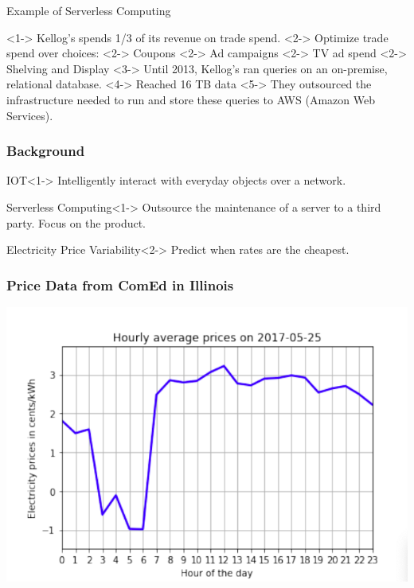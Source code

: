\documentclass{beamer}
\begin{document}
\begin{frame}
    \begin{block}{Example of Serverless Computing}
        \begin{outline}
            \1 <1-> Kellog's spends 1/3 of its revenue on trade spend.
            \2 <2-> Optimize trade spend over choices:
            \3 <2-> Coupons
            \3 <2-> Ad campaigns
            \3 <2-> TV ad spend
            \3 <2-> Shelving and Display
            \1 <3-> Until 2013, Kellog's ran queries on an on-premise, relational
            database.
            \1 <4-> Reached 16 TB data
            \2 <5-> They outsourced the infrastructure needed to run and store 
            these queries to AWS (Amazon Web Services).
        \end{outline}
    \end{block}
\end{frame}

\begin{frame}
    \frametitle{Background}
    \begin{block}{IOT}<1->
        Intelligently interact with everyday objects over a network.
    \end{block}
    \begin{block}{Serverless Computing}<1->
        Outsource the maintenance of a server to a third party. Focus on the product. 
    \end{block}
    \begin{block}{Electricity Price Variability}<2->
        Predict when rates are the cheapest. 
    \end{block}
\end{frame}

\begin{frame}
    \frametitle{Price Data from ComEd in Illinois}
    \includegraphics[width=0.9\paperwidth,height=0.8\paperheight,keepaspectratio]{pictures/average_hourly_prices}
    \cite{Jemand2000} 
\end{frame}
\end{document}
